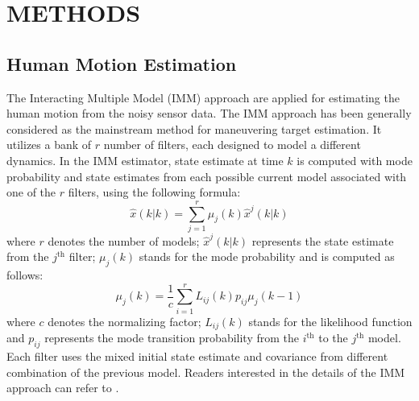 \documentclass[letterpaper, 10 pt, conference]{ieeeconf}
\begin{document}
\section{METHODS} \label{sec:framework}

\subsection*{Human Motion Estimation}\label{subsec:human_track}
The Interacting Multiple Model (IMM) approach are applied for estimating the human motion from the noisy sensor data.
The IMM approach has been generally considered as the mainstream method for maneuvering target estimation. 
It utilizes a bank of $r$ number of filters, each designed to model a different dynamics.
In the IMM estimator, state estimate at time $k$ is computed with mode probability and state estimates from each possible current model associated with one of the $r$ filters, using the following formula:
\[
\hat{x}(k|k)=\sum\limits_{j=1}^{r}\mu_j(k)\hat{x}^j(k|k)
\]
where $r$ denotes the number of models; $\hat{x}^j(k|k)$ represents the state estimate from the $j^\text{th}$ filter; $\mu_j(k)$ stands for the mode probability and is computed as follows:
\[
\mu_j(k)=\frac{1}{c}\sum\limits_{i=1}^{r}L_{ij}(k)p_{ij}\mu_j(k-1)
\]
where $c$ denotes the normalizing factor; $L_{ij}(k)$ stands for the likelihood function and $p_{ij}$ represents the mode transition probability from the $i^\text{th}$ to the $j^\text{th}$ model. 
Each filter uses the mixed initial state estimate and covariance from different combination of the previous model. 
Readers interested in the details of the IMM approach can refer to \cite{yaakov2002estimation}.

\end{document}
